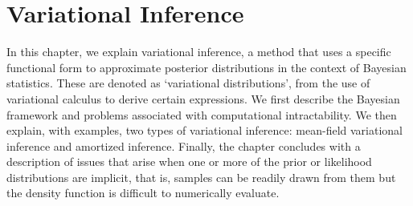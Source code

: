 \documentclass[honours,12pt]{unswthesis}
\numberwithin{equation}{section}
\theoremstyle{definition}
\begin{document}
\chapter{Variational Inference}\label{ch3}
In this chapter, we explain variational inference, a method that uses a specific functional form to approximate posterior distributions in the context of Bayesian statistics. These are denoted as `variational distributions', from the use of variational calculus to derive certain expressions. We first describe the Bayesian framework and problems associated with computational intractability. We then explain, with examples, two types of variational inference: mean-field variational inference and amortized inference. Finally, the chapter concludes with a description of issues that arise when one or more of the prior or likelihood distributions are implicit, that is, samples can be readily drawn from them but the density function is difficult to numerically evaluate.
\end{document}

